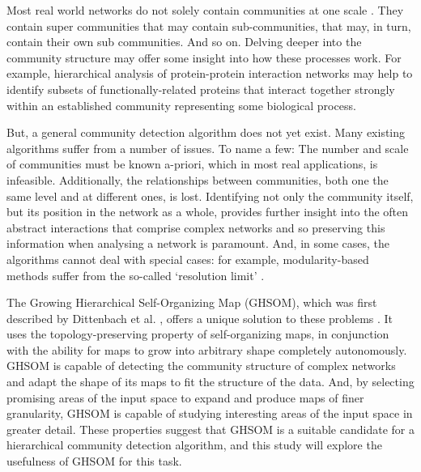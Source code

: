 \documentclass{report}
\begin{document}
	Most real world networks do not solely contain communities at one scale \cite{lancichinetti2009detecting,yang2013hierarchical}. 
	They contain super communities that may contain sub-communities, that may, in turn, contain their own sub communities.
	And so on. 
	Delving deeper into the community structure may offer some insight into how these processes work.
	For example, hierarchical analysis of protein-protein interaction networks may help to identify subsets of functionally-related proteins that interact together strongly within an established community representing some biological process.
	
	But, a general community detection algorithm does not yet exist.
	Many existing algorithms suffer from a number of issues. 
	To name a few:
	The number and scale of communities must be known a-priori, which in most real applications, is infeasible.
	Additionally, the relationships between communities, both one the same level and at different ones, is lost.
	Identifying not only the community itself, but its position in the network as a whole, provides further insight into the often abstract interactions that comprise complex networks and so preserving this information when analysing a network is paramount.
	And, in some cases, the algorithms cannot deal with special cases: for example, modularity-based methods suffer from the so-called `resolution limit' \cite{fortunato2007resolution}.
	
	The Growing Hierarchical Self-Organizing Map (GHSOM), which was first described by Dittenbach et al. \cite{dittenbach2000growing},
	offers a unique solution to these problems .
	It uses the topology-preserving property of self-organizing maps, in conjunction with the ability for maps to grow into arbitrary shape completely autonomously. 
	GHSOM is capable of detecting the community structure of complex networks and adapt the shape of its maps to fit the structure of the data.  
	And, by selecting promising areas of the input space to expand and produce maps of finer granularity, GHSOM is capable of studying interesting areas of  the input space in greater detail.
	These properties suggest that GHSOM is a suitable candidate for a hierarchical community detection algorithm, and this study will explore the usefulness of GHSOM for this task.
\end{document}
